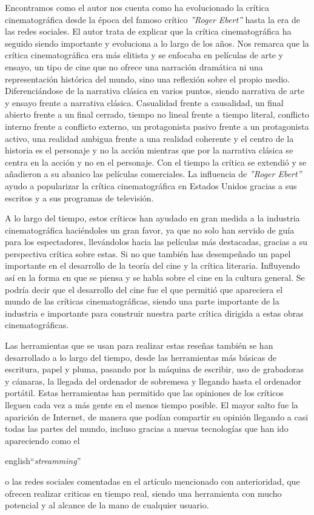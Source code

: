Encontramos como el autor nos cuenta como ha evolucionado la crítica cinematográfica desde la época del 
famoso crítico \textit{''Roger Ebert''} hasta la era de las redes sociales. El autor trata de explicar 
que la crítica cinematográfica ha seguido siendo importante y evoluciona a lo largo de los años. Nos 
remarca que la crítica cinematográfica era más elitista y se enfocaba en películas de arte y ensayo, un 
tipo de cine que no ofrece una narración dramática ni una representación histórica del mundo, sino una 
reflexión sobre el propio medio. Diferenciándose de la narrativa clásica en varios puntos, siendo 
narrativa de arte y ensayo frente a narrativa clásica. Casualidad frente a  causalidad, un final 
abierto frente a un final cerrado, tiempo no lineal frente a tiempo literal, conflicto interno frente a 
conflicto externo, un protagonista pasivo frente a un protagonista activo, una realidad ambigua frente 
a una realidad coherente y el centro de la historia es el personaje y no la acción mientras que por la 
narrativa clásica se centra en la acción y no en el personaje. Con el tiempo la crítica se extendió y 
se añadieron a su abanico las películas comerciales. La influencia de \textit{''Roger Ebert''} ayudo a 
popularizar la crítica cinematográfica en Estados Unidos gracias a sus escritos y a sus programas de 
televisión. 

A lo largo del tiempo, estos críticos han ayudado en gran medida a la industria cinematográfica 
haciéndoles un gran favor, ya que no solo han servido de guía para los espectadores, llevándolos hacia 
las películas más destacadas, gracias a su perspectiva crítica sobre estas. Si no que también has 
desempeñado un papel importante en el desarrollo de la teoría del cine y la crítica literaria. 
Influyendo así en la forma en que se piensa y se habla sobre el cine en la cultura general. Se podría 
decir que el desarrollo del cine fue el que permitió que apareciera el mundo de las críticas 
cinematográficas, siendo una parte importante de la industria e importante para construir nuestra parte 
crítica dirigida a estas obras cinematográficas. 

Las herramientas que se usan para realizar estas reseñas también se han desarrollado a lo largo del 
tiempo, desde las herramientas más básicas de escritura, papel y pluma, pasando por la máquina de 
escribir, uso de grabadoras y cámaras, la llegada del ordenador de sobremesa y llegando hasta el 
ordenador portátil. Estas herramientas han permitido que las opiniones de los críticos lleguen cada vez 
a más gente en el menos tiempo posible. El mayor salto fue la aparición de Internet, de manera que 
podían compartir su opinión llegando a casi todas las partes del mundo, incluso gracias a nuevas 
tecnologías que han ido apareciendo como el \begin{otherlanguage}
{english}``\textit{streamming}''\end{otherlanguage} o las redes sociales comentadas en el artículo 
mencionado con anterioridad, que ofrecen realizar criticas en tiempo real, siendo una herramienta con 
mucho potencial y al alcance de la mano de cualquier usuario.

